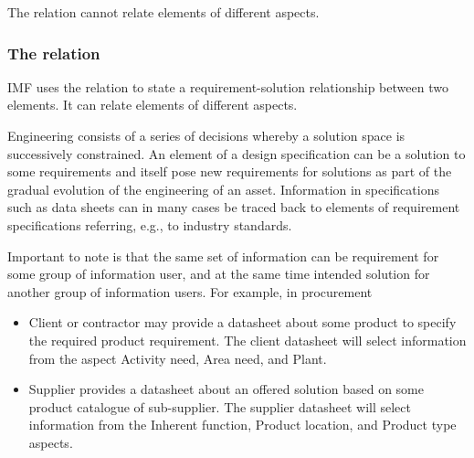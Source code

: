 \documentclass[../main.tex]{subfiles}
\begin{document}
The  relation cannot relate elements of different aspects.

\subsubsection{The  relation}
IMF uses the  relation to state a requirement-solution relationship between two elements. It can relate elements of different aspects. 

Engineering consists of a series of decisions whereby a solution space is successively constrained. An element of a design specification can be a solution to some requirements and itself pose new requirements for solutions as part of the gradual evolution of the engineering of an asset. Information in specifications such as data sheets can in many cases be traced back to elements of requirement specifications referring, e.g., to industry standards.


Important to note is that the same set of information can be requirement for some group of information user, and at the same time intended solution for another group of information users. For example, in procurement
\begin{itemize}
    \item Client or contractor may provide a datasheet about some product to specify the required product requirement. The client datasheet will select information from the aspect Activity need, Area need, and Plant. 
    \item Supplier provides a datasheet about an offered solution based on some product catalogue of sub-supplier. The supplier datasheet will select information from the  Inherent function, Product location, and Product type aspects.
\end{itemize}

\end{document}
